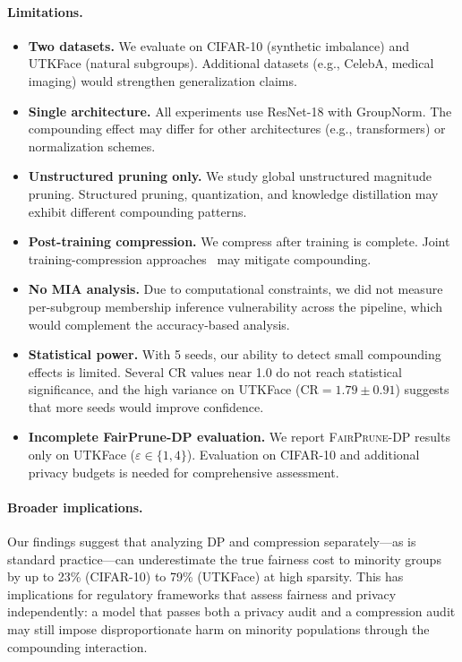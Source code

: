 \documentclass{article}
\newcommand{\CR}{\text{CR}}
\newcommand{\FairPrunDP}{\textsc{FairPrune-DP}}
\begin{document}
\paragraph{Limitations.}
\begin{itemize}
    \item \textbf{Two datasets.} We evaluate on CIFAR-10 (synthetic imbalance) and UTKFace (natural subgroups). Additional datasets (e.g., CelebA, medical imaging) would strengthen generalization claims.
    \item \textbf{Single architecture.} All experiments use ResNet-18 with GroupNorm. The compounding effect may differ for other architectures (e.g., transformers) or normalization schemes.
    \item \textbf{Unstructured pruning only.} We study global unstructured magnitude pruning. Structured pruning, quantization, and knowledge distillation may exhibit different compounding patterns.
    \item \textbf{Post-training compression.} We compress after training is complete. Joint training-compression approaches~\citep{adamczewski2023prepruning} may mitigate compounding.
    \item \textbf{No MIA analysis.} Due to computational constraints, we did not measure per-subgroup membership inference vulnerability across the pipeline, which would complement the accuracy-based analysis.
    \item \textbf{Statistical power.} With 5 seeds, our ability to detect small compounding effects is limited. Several CR values near 1.0 do not reach statistical significance, and the high variance on UTKFace ($\CR = 1.79 \pm 0.91$) suggests that more seeds would improve confidence.
    \item \textbf{Incomplete FairPrune-DP evaluation.} We report \FairPrunDP{} results only on UTKFace ($\varepsilon \in \{1, 4\}$). Evaluation on CIFAR-10 and additional privacy budgets is needed for comprehensive assessment.
\end{itemize}

\paragraph{Broader implications.}
Our findings suggest that analyzing DP and compression separately---as is standard practice---can underestimate the true fairness cost to minority groups by up to 23\% (CIFAR-10) to 79\% (UTKFace) at high sparsity. This has implications for regulatory frameworks that assess fairness and privacy independently: a model that passes both a privacy audit and a compression audit may still impose disproportionate harm on minority populations through the compounding interaction.
\end{document}

